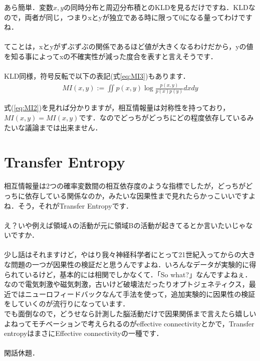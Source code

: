 \documentclass[11pt,a4paper,dvipdfmx]{ujreport}
\begin{document}
あら簡単．$変数x,y$の同時分布と周辺分布積とのKLDを見るだけですね．KLDなので，両者が同じ，つまりxとyが独立である時に限って0になる量ってわけですね．\\
\\

てことは，xとyがずぶずぶの関係であるほど値が大きくなるわけだから，yの値を知る事によってxの不確実性が減った度合を表すと言えそうです\cite{prml}．\\
\\

KLD同様，符号反転で以下の表記(式\ref{eq:MI3})もあります．
\begin{eqnarray}
\label{eq:MI3}
  MI(x,y) := \iint p(x,y) \log \frac{p(x,y)}{p(x)p(y)} dxdy
\end{eqnarray}

式(\ref{eq:MI2})を見れば分かりますが，相互情報量は対称性を持っており，$MI(x,y) = MI(x,y)$です．なのでどっちがどっちにどの程度依存しているみたいな議論までは出来ません．
\section{Transfer Entropy}
相互情報量は2つの確率変数間の相互依存度のような指標でしたが，どっちがどっちに依存している関係なのか，みたいな因果性まで見れたらかっこいいですよね．そう，それがTransfer Entropyです．\\
\\

え？いや例えば領域Aの活動が元に領域Bの活動が起きてるとか言いたいじゃないですか．\\
\\

少し話はそれますけど，やはり我々神経科学者にとって21世紀入ってからの大きな問題の一つが因果性の検証だと思うんですよね．いろんなデータが実験的に得られているけど，基本的には相関でしかなくて．「So what?」なんですよねぇ．なので電気刺激や磁気刺激，古いけど破壊法だったりオプトジェネティクス，最近ではニューロフィードバックなんて手法を使って，追加実験的に因果性の検証をしていくのが流行りになっています．\\

でも面倒なので，どうせなら計測した脳活動だけで因果関係まで言えたら嬉しいよねってモチベーションで考えられるのがeffective connectivityとかで，Transfer entropyはまさにEffective connectivityの一種です．\\
\\

閑話休題．\\
\\
\end{document}
